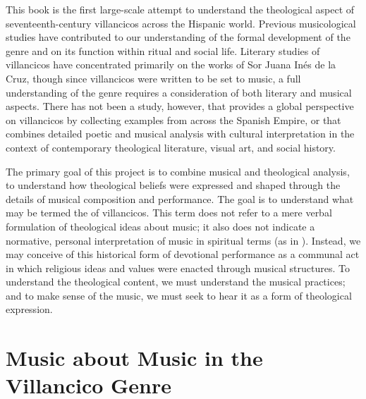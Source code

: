 This book is the first large-scale attempt to understand the theological aspect of seventeenth-century villancicos across the Hispanic world.
Previous musicological studies have contributed to our understanding of the formal development of the genre and on its function within ritual and social life. %
Literary studies of villancicos have concentrated primarily on the works of Sor Juana Inés de la Cruz, though since villancicos were written to be set to music, a full understanding of the genre requires a consideration of both literary and musical aspects. %
There has not been a study, however, that provides a global perspective on villancicos by collecting examples from across the Spanish Empire, or that combines detailed poetic and musical analysis with cultural interpretation in the context of contemporary theological literature, visual art, and social history.

The primary goal of this project is to combine musical and theological analysis, to understand how theological beliefs were expressed and shaped through the details of musical composition and performance.
The goal is to understand what may be termed the  of villancicos.
This term does not refer to a mere verbal formulation of theological ideas about music; it also does not indicate a normative, personal interpretation of music in spiritual terms (as in ). %
Instead, we may conceive of this historical form of devotional performance as a communal act in which religious ideas and values were enacted through musical structures.
To understand the theological content, we must understand the musical practices; and to make sense of the music, we must seek to hear it as a form of theological expression.


\section{Music about Music in the Villancico Genre}

